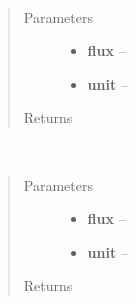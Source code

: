 \documentclass[a4paper,10pt,english]{sphinxmanual}
\begin{document}
\begin{fulllineitems}
\label{wtoapi:wtoDatabase.convert_jy}~\begin{quote}\begin{description}
\item[{Parameters}] \leavevmode\begin{itemize}
\item {} 
\textbf{flux} -- 

\item {} 
\textbf{unit} -- 

\end{itemize}

\item[{Returns}] \leavevmode


\end{description}\end{quote}

\end{fulllineitems}


\begin{fulllineitems}
\label{wtoapi:wtoDatabase.convert_mjy}~\begin{quote}\begin{description}
\item[{Parameters}] \leavevmode\begin{itemize}
\item {} 
\textbf{flux} -- 

\item {} 
\textbf{unit} -- 

\end{itemize}

\item[{Returns}] \leavevmode


\end{description}\end{quote}

\end{fulllineitems}

\end{document}
